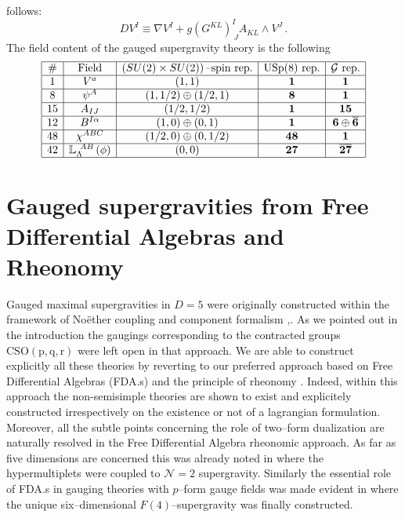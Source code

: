 \documentclass[a4paper,12pt]{article}
\begin{document}
follows:
\begin{equation}
DV^I\equiv \nabla V^I+g(G^{KL})^I_{~J}A_{KL}\wedge V^J\,.
\label{covGder}
\end{equation}
The field content of the gauged supergravity theory is the following
\begin{equation}
\begin{array}{|c|c|c|c|c|}
\hline
\#& \hbox{Field} & \left(SU(2)\times SU(2)\right) \hbox{--spin~rep.} & \mathrm{USp(8)}
\hbox{~rep.} & \mathcal{G}
\hbox{~rep.} \\
\hline
1& V^a & (1,1) & {\bf 1} & {\bf 1} \\
\hline
8& \psi^A & (1,1/2)\oplus (1/2,1) & {\bf 8} & {\bf 1} \\
\hline
15& A_{IJ} & (1/2,1/2) & {\bf 1} & {\bf 15} \\
\hline
12& B^{I\alpha} & (1,0)\oplus (0,1) & {\bf 1} & {\bf 6\oplus \overline{{6}}} \\
\hline
48& \chi^{ABC} & (1/2,0)\oplus (0,1/2) & {\bf 48} & {\bf 1} \\
\hline
42& \mathbb{L}_{\Lambda}^{~AB}\left(\phi\right) & (0,0) & {\bf 27} & {\bf\overline{{27}}} \\
\hline
\end{array}
\label{gaugedfieldcontent}
\end{equation}
\section{Gauged supergravities from
Free Differential Algebras  and Rheonomy} Gauged maximal
supergravities in $D=5$ were originally constructed within the
framework of  No\"ether coupling and component formalism
\cite{gunwar},\cite{PPV}. As we pointed out in the introduction
the gaugings corresponding to the contracted groups
$\mathrm{CSO(p,q,r)}$ were left open in that approach. We are able
to construct explicitly all these theories by reverting to our
preferred approach based on Free Differential Algebras (FDA.s) and
the principle of rheonomy \cite{castdauriafre}. Indeed, within
this approach the non-semisimple theories are shown to exist and
explicitely constructed irrespectively on the existence or not of
a lagrangian formulation. Moreover, all the subtle points
concerning the role of two--form dualization are naturally
resolved in the Free Differential Algebra rheonomic approach. As
far as five dimensions are concerned this was already noted  in
\cite{Ceresole:2000jd} where the hypermultiplets were coupled to
$\mathcal{N}=2$ supergravity. Similarly the essential role of
FDA.s in gauging theories with $p$--form gauge fields was made
evident in \cite{F4} where the unique six--dimensional
$F(4)$--supergravity was finally constructed.
\end{document}
